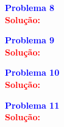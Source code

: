 \documentclass[a4paper,12pt]{article}
\newcommand{\printingbibliography}{%

    \pagestyle{myheadings}
    \markright{}
    \sloppy
    \printbibliography[heading=bibintoc, %
                   title=Refer\^encias %
                  ]
    \fussy%
}
\begin{document}
\begin{flushleft}
\textbf{\textcolor{blue}{\Large Problema 8}}\\

\textcolor{red}{\textbf{Solução:}}\\
\end{flushleft}

\begin{flushleft}
\textbf{\textcolor{blue}{\Large Problema 9}}\\

\textcolor{red}{\textbf{Solução:}}\\
\end{flushleft}

\begin{flushleft}
\textbf{\textcolor{blue}{\Large Problema 10}}\\

\textcolor{red}{\textbf{Solução:}}\\
\end{flushleft}


\begin{flushleft}
\textbf{\textcolor{blue}{\Large Problema 11}}\\

\textcolor{red}{\textbf{Solução:}}\\
\end{flushleft}



\end{document}
